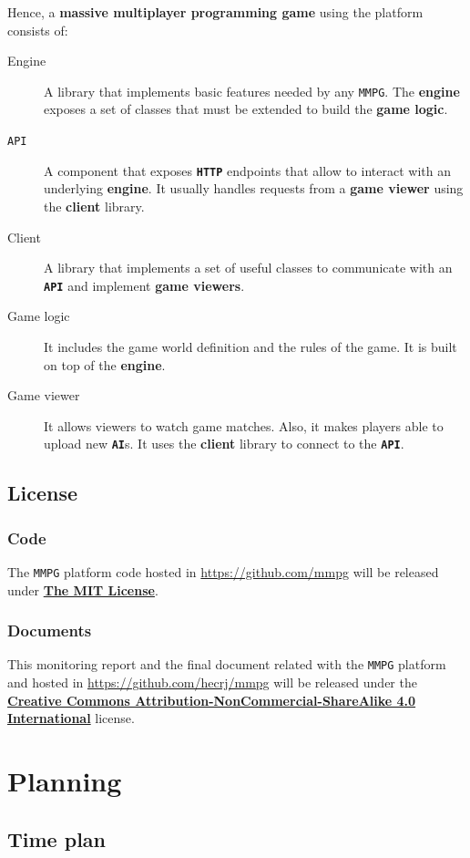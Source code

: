 \documentclass[a4paper,11pt,titlepage,abstract,numbers=noenddot,automark,mnsy,intlimits,rgb,dvipsnames]{report}
\begin{document}
Hence, a \textbf{massive multiplayer programming game} using the platform consists of:
\begin{description}
\item[Engine]
A library that implements basic features needed by any \texttt{MMPG}. The \textbf{engine} exposes a set
  of classes that must be extended to build the \textbf{game logic}.
\item[\texttt{API}]
A component that exposes \textbf{\texttt{HTTP}} endpoints that allow to interact with an underlying \textbf{engine}. It
  usually handles requests from a \textbf{game viewer} using the \textbf{client} library.
\item[Client]
A library that implements a set of useful classes to communicate with an \textbf{\texttt{API}} and implement
  \textbf{game viewers}.
\item[Game logic]
It includes the game world definition and the rules of the game. It is built on top of the \textbf{engine}.
\item[Game viewer]
It allows viewers to watch game matches. Also, it makes players able to upload new \textbf{\texttt{AI}}s. It uses
    the \textbf{client} library to connect to the \textbf{\texttt{API}}.
\end{description}
\clearpage
\chapter{License}
\section{Code}
The \texttt{MMPG} platform code hosted in \url{https://github.com/mmpg} will be released under
\href{https://opensource.org/licenses/MIT}{\textbf{The MIT License}}.
\section{Documents}
This monitoring report and the final document related with the \texttt{MMPG} platform and hosted in
\url{https://github.com/hecrj/mmpg} will be released under the
\href{http://creativecommons.org/licenses/by-nc-sa/4.0/legalcode.txt}{\textbf{Creative Commons Attribution-NonCommercial-ShareAlike 4.0 International}}
license.
\clearpage
\part{Planning}
\chapter{Time plan}
\end{document}
